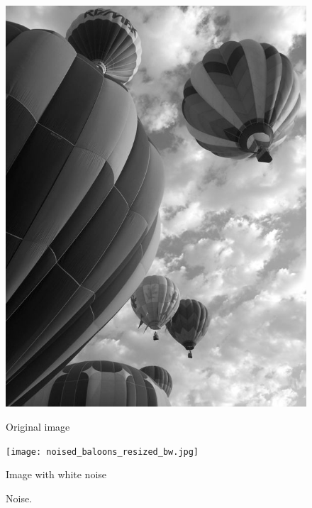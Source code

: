 %
%
%
\begin{figure}
\begin{minipage}[b]{.47\linewidth}
\centering
\includegraphics[width=\textwidth]{baloons_resized_bw.jpg}
\caption*{Original image}
\end{minipage}
\hspace{0.5cm}
\begin{minipage}[b]{0.47\linewidth}
\centering
\texttt{[image: noised\_baloons\_resized\_bw.jpg]}
\caption*{Image with white noise}
\end{minipage}
\caption{Noise.}
\label{fig:noise_firstattempt}
\end{figure}

